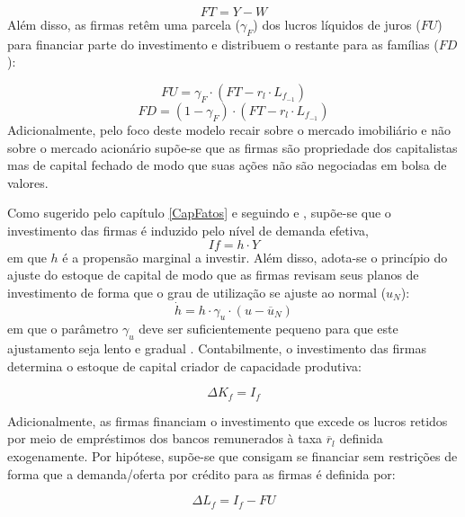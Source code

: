 \begin{equation}
    FT = Y - W
\end{equation}
Além disso, as firmas retêm uma parcela ($\gamma_F$) dos lucros líquidos de juros ($FU$) para financiar parte do investimento e distribuem o restante para as famílias ($FD$):

\begin{equation}
    FU = \gamma_F\cdot (FT - r_l\cdot L_{f_{-1}})
\end{equation}
\begin{equation}
    FD = (1-\gamma_F)\cdot (FT - r_l\cdot L_{f_{-1}})
\end{equation}
Adicionalmente, pelo foco deste modelo recair sobre o mercado imobiliário e não sobre o mercado acionário supõe-se que as firmas são propriedade dos capitalistas mas de capital fechado de modo que suas ações não são negociadas em bolsa de valores.

Como sugerido pelo capítulo \ref{CapFatos} e seguindo \textcite{serrano_long_1995} e \textcite{serrano_sraffian_2017}, supõe-se que o investimento das firmas é induzido pelo nível de demanda efetiva,
\begin{equation}
\label{_If}
    If = h\cdot Y
\end{equation}
em que $h$ é a propensão marginal a investir. Além disso, adota-se o princípio do ajuste do estoque de capital de modo que as firmas revisam seus planos de investimento de forma que o grau de utilização se ajuste ao normal ($u_N$):
\begin{equation}
\label{_h}
    \dot h = h\cdot \gamma_u\cdot (u - \overline{u}_N)
\end{equation}
em que o parâmetro $\gamma_u$ deve ser suficientemente pequeno para que este ajustamento seja lento e gradual \cite[p.~271]{freitas_growth_2015}. Contabilmente, o investimento das firmas determina o estoque de capital criador de capacidade produtiva:

\begin{equation}
    \Delta K_f = I_f
\end{equation}

Adicionalmente, as firmas financiam o investimento que excede os lucros retidos por meio de empréstimos dos bancos remunerados à taxa $\overline r_l$ definida exogenamente. Por hipótese, supõe-se que consigam se financiar sem restrições de forma que a demanda/oferta por crédito para as firmas é definida por:

\begin{equation}
    \Delta L_f = I_f - FU
\end{equation}

